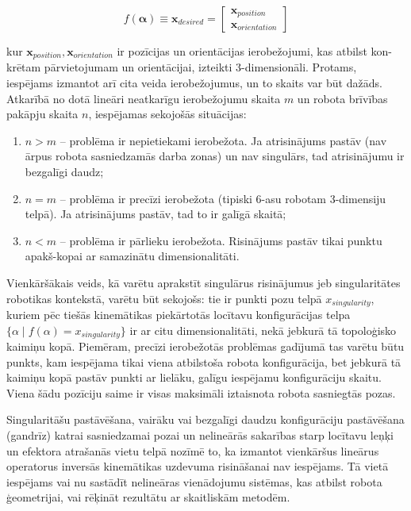 \documentclass[12pt, a4paper]{article}
\numberwithin{equation}{section} %
\begin{document}
\begin{equation}
    f(\boldsymbol{\alpha}) \equiv \boldsymbol{x}_{desired} = 
    \begin{bmatrix}
        \boldsymbol{x}_{position} \\
        \boldsymbol{x}_{orientation} 
    \end{bmatrix}
\end{equation}

kur $\boldsymbol{x}_{position}, \boldsymbol{x}_{orientation}$ ir pozīcijas un orientācijas ierobežojumi, kas atbilst kon-krētam pārvietojumam un orientācijai, izteikti 3-dimensionāli. Protams, iespējams izmantot arī cita veida ierobežojumus, un to skaits var būt dažāds. Atkarībā no dotā lineāri neatkarīgu ierobežojumu skaita $m$ un robota brīvības pakāpju skaita $n$, iespējamas sekojošās situācijas:

\begin{enumerate}
    \item $n > m$ -- problēma ir nepietiekami ierobežota. Ja atrisinājums pastāv (nav ārpus robota sasniedzamās darba zonas) un nav singulārs, tad atrisinājumu ir bezgalīgi daudz;
    \item $n = m$ -- problēma ir precīzi ierobežota  (tipiski 6-asu robotam 3-dimensiju telpā). Ja atrisinājums pastāv, tad to ir galīgā skaitā;
    \item $n < m$ -- problēma ir pārlieku ierobežota. Risinājums pastāv tikai punktu apakš-kopai ar samazinātu dimensionalitāti.
\end{enumerate}

Vienkāršākais veids, kā varētu aprakstīt singulārus risinājumus jeb singularitātes robotikas kontekstā, varētu būt sekojošs: tie ir punkti pozu telpā $x_{singularity}$, kuriem pēc tiešās kinemātikas piekārtotās locītavu konfigurācijas telpa $\lbrace \alpha \mid f(\alpha) = x_{singularity} \rbrace$ ir ar citu dimensionalitāti, nekā jebkurā tā topoloģisko kaimiņu kopā. Piemēram, precīzi ierobežotās problēmas gadījumā tas varētu būtu punkts, kam iespējama tikai viena atbilstoša robota konfigurācija, bet jebkurā tā kaimiņu kopā pastāv punkti ar lielāku, galīgu iespējamu konfigurāciju skaitu. Viena šādu pozīciju saime ir visas maksimāli iztaisnota robota sasniegtās pozas.

Singularitāšu pastāvēšana, vairāku vai bezgalīgi daudzu konfigurāciju pastāvēšana (gandrīz) katrai sasniedzamai pozai un nelineārās sakarības starp locītavu leņķi un efektora atrašanās vietu telpā nozīmē to, ka izmantot vienkāršus lineārus operatorus inversās kinemātikas uzdevuma risināšanai nav iespējams. Tā vietā iespējams vai nu sastādīt nelineāras vienādojumu sistēmas, kas atbilst robota ģeometrijai, vai rēķināt rezultātu ar skaitliskām metodēm. 
\end{document}
